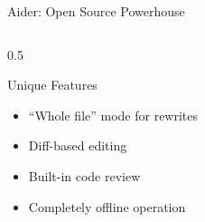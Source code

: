 \documentclass[aspectratio=169,11pt]{beamer}
\begin{document}
\begin{frame}{Aider: Open Source Powerhouse}
\begin{columns}[T]
\begin{column}{0.5\textwidth}
            \begin{block}{Unique Features}
                \begin{itemize}
                    \item ``Whole file'' mode for rewrites
                    \item Diff-based editing
                    \item Built-in code review
                    \item Completely offline operation
                \end{itemize}
            \end{block}
        \end{column}
    \end{columns}

\end{frame}
\end{document}
